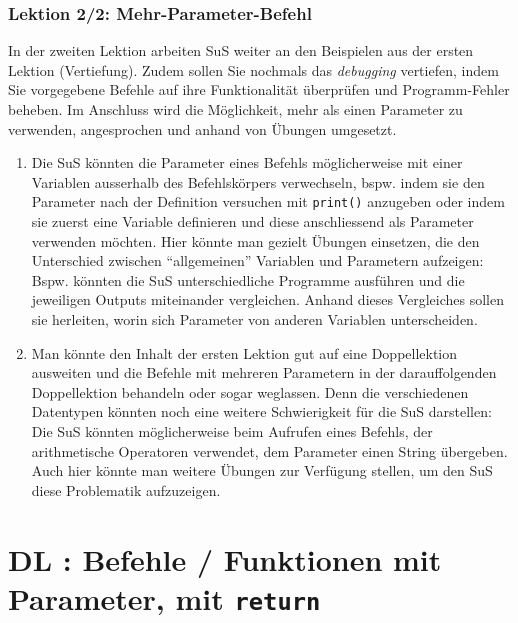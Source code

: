 \begin{myExBox}[title=DL \themycounter]
\subsubsection*{Lektion 2/2: Mehr-Parameter-Befehl}
In der zweiten Lektion arbeiten SuS weiter an den Beispielen aus der ersten Lektion (Vertiefung). Zudem sollen Sie nochmals das \textit{debugging} vertiefen, indem Sie vorgegebene Befehle auf ihre Funktionalität überprüfen und Programm-Fehler beheben. Im Anschluss wird die Möglichkeit, mehr als einen Parameter zu verwenden, angesprochen und anhand von Übungen umgesetzt.

\begin{myExBox}[title=Mögliche Schwierigkeiten \& geeignete Massnahmen]
\begin{enumerate}
    \item Die SuS könnten die Parameter eines Befehls möglicherweise mit einer Variablen ausserhalb des Befehlskörpers verwechseln, bspw. indem sie den Parameter nach der Definition versuchen mit \lstinline|print()| anzugeben oder indem sie zuerst eine Variable definieren und diese anschliessend als Parameter verwenden möchten. Hier könnte man gezielt Übungen einsetzen, die den Unterschied zwischen \enquote{allgemeinen} Variablen und Parametern aufzeigen: Bspw. könnten die SuS unterschiedliche Programme ausführen und die jeweiligen Outputs miteinander vergleichen. Anhand dieses Vergleiches sollen sie herleiten, worin sich Parameter von anderen Variablen unterscheiden.
    \item Man könnte den Inhalt der ersten Lektion gut auf eine Doppellektion ausweiten und die Befehle mit mehreren Parametern in der darauffolgenden Doppellektion behandeln oder sogar weglassen. Denn die verschiedenen Datentypen könnten noch eine weitere Schwierigkeit für die SuS darstellen: Die SuS könnten möglicherweise beim Aufrufen eines Befehls, der arithmetische Operatoren verwendet, dem Parameter einen String übergeben. Auch hier könnte man weitere Übungen zur Verfügung stellen, um den SuS diese Problematik aufzuzeigen.
\end{enumerate}
\end{myExBox}
\end{myExBox}
\newpage{}

\section{DL \themycounter: Befehle / Funktionen mit Parameter, mit \texorpdfstring{\lstinline|return|}{return}}

